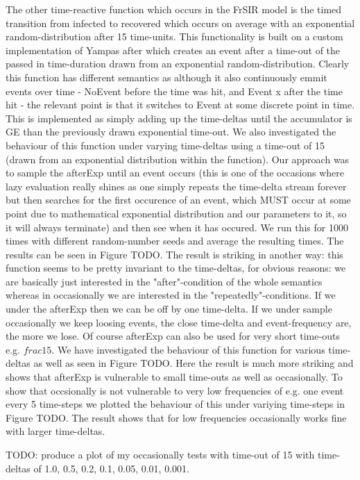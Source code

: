 The other time-reactive function which occurs in the FrSIR model is the timed transition from infected to recovered which occurs on average with an exponential random-distribution after 15 time-units. This functionality is built on a custom implementation of Yampas after which creates an event after a time-out of the passed in time-duration drawn from an exponential random-distribution. Clearly this function has different semantics as although it also continuously emmit events over time - NoEvent before the time was hit, and Event x after the time hit - the relevant point is that it switches to Event at some discrete point in time. This is implemented as simply adding up the time-deltas until the accumulator is GE than the previously drawn exponential time-out. We also investigated the behaviour of this function under varying time-deltas using a time-out of 15 (drawn from an exponential distribution within the function). Our approach was to sample the afterExp until an event occurs (this is one of the occasions where lazy evaluation really shines as one simply repeats the time-delta stream forever but then searches for the first occurence of an event, which MUST occur at some point due to mathematical exponential distribution and our parameters to it, so it will always terminate) and then see when it has occured. We run this for 1000 times with different random-number seeds and average the resulting times. The results can be seen in Figure TODO. The result is striking in another way: this function seems to be pretty invariant to the time-deltas, for obvious reasons: we are basically just interested in the "after"-condition of the whole semantics whereas in occasionally we are interested in the "repeatedly"-conditions. If we under the afterExp then we can be off by one time-delta. If we under sample occasionally we keep loosing events, the close time-delta and event-frequency are, the more we lose. Of course afterExp can also be used for very short time-outs e.g. $frac{1}{5}$. We have investigated the behaviour of this function for various time-deltas as well as seen in Figure TODO. Here the result is much more striking and shows that afterExp is vulnerable to small time-outs as well as occasionally. 
To show that occsionally is not vulnerable to very low frequencies of e.g. one event every 5 time-steps we plotted the behaviour of this under variying time-steps in Figure TODO. The result shows that for low frequencies occasionally works fine with larger time-deltas.

TODO: produce a plot of my occasionally tests with time-out of 15 with time-deltas of 1.0, 0.5, 0.2, 0.1, 0.05, 0.01, 0.001.

